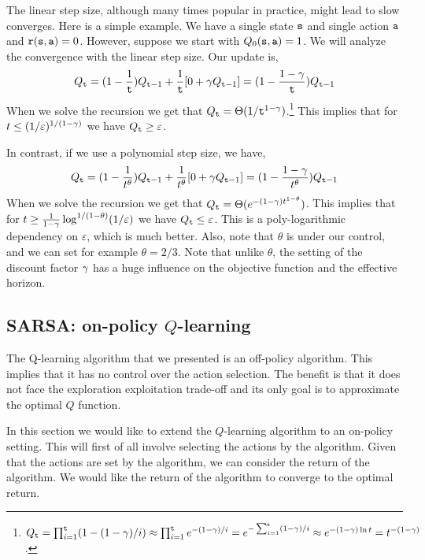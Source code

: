 The linear step size, although many times popular in practice, might
lead to slow converges. Here is a simple example. We have a single
state ${\tt s}$ and single action ${\tt a}$ and
${\tt r}({\tt s},{\tt a})=0$. However, suppose we start with
$Q_0({\tt s},{\tt a})=1$. We will analyze the convergence with the
linear step size. Our update is,
\[
Q_{\tt t} =
(1-\frac{1}{{\tt t}})Q_{{\tt t}-1}+\frac{1}{{\tt t}}[0+\gamma
Q_{{\tt t}-1}]=(1-\frac{1-\gamma}{{\tt t}})Q_{{\tt t}-1}
\]
When we solve the recursion we get that
$Q_{\tt t}=\Theta(1/{\tt t}^{1-\gamma})$.\footnote{$Q_{\tt t}=\prod_{i=1}^{\tt t} (1-(1-\gamma)/i)\approx
\prod_{i=1}^{\tt t} e^{-(1-\gamma)/i}=e^{-\sum_{i=1}^{\tt t}
(1-\gamma)/i }\approx e^{-(1-\gamma)\ln
t}=t^{-(1-\gamma)}$. }
%
This implies that for $t\leq  (1/\varepsilon)^{1/(1-\gamma)}$ we
have $Q_{\tt t} \geq \varepsilon$.

In contrast, if we use a polynomial step size, we have,
\[
Q_{\tt t} =
(1-\frac{1}{t^\theta})Q_{{\tt t}-1}+\frac{1}{t^\theta}[0+\gamma
Q_{{\tt t}-1}]=(1-\frac{1-\gamma}{t^\theta})Q_{{\tt t}-1}
\]
When we solve the recursion we get that
$Q_{\tt t}=\Theta(e^{-(1-\gamma)t^{1-\theta}})$. This implies that
for $t\geq \frac{1}{1-\gamma}\log^{1/(1-\theta)} (1/\varepsilon)$
we have $Q_{\tt t} \leq \varepsilon$. This is a poly-logarithmic
dependency on $\varepsilon$, which is much better. Also, note that
$\theta$ is under our control, and we can set for example
$\theta=2/3$. Note that unlike $\theta$, the setting of the discount
factor $\gamma$ has a huge influence on the objective function
and the effective horizon.

\subsection{SARSA: on-policy $Q$-learning}

The Q-learning algorithm that we presented is an off-policy
algorithm. This implies that it has no control over the action
selection. The benefit is that it does not face the exploration
exploitation trade-off and its only goal is to approximate the
optimal $Q$ function.

In this section we would like to extend the $Q$-learning algorithm
to an on-policy setting. This will first of all involve selecting
the actions by the algorithm. Given that the actions are set by the
algorithm, we can consider the return of the algorithm. We would
like the return of the algorithm to converge to the optimal return.


